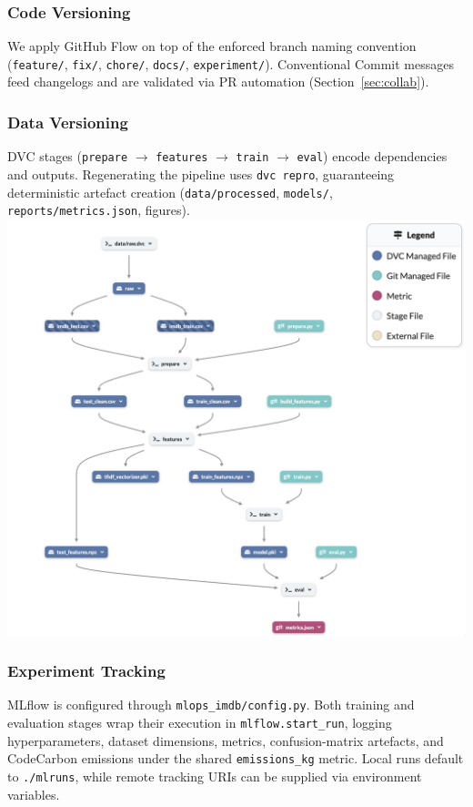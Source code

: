 \documentclass[11pt,a4paper]{article}
\begin{document}
\subsubsection{Code Versioning}
We apply GitHub Flow on top of the enforced branch naming convention (\texttt{feature/}, \texttt{fix/}, \texttt{chore/}, \texttt{docs/}, \texttt{experiment/}). Conventional Commit messages feed changelogs and are validated via PR automation (Section~\ref{sec:collab}).

\subsubsection{Data Versioning}
DVC stages (\texttt{prepare} $\rightarrow$ \texttt{features} $\rightarrow$ \texttt{train} $\rightarrow$ \texttt{eval}) encode dependencies and outputs. Regenerating the pipeline uses \texttt{dvc repro}, guaranteeing deterministic artefact creation (\texttt{data/processed}, \texttt{models/}, \texttt{reports/metrics.json}, figures).
\includegraphics[width=1\textwidth]{dvc_pipeline.png}
\subsubsection{Experiment Tracking}
MLflow is configured through \texttt{mlops\_imdb/config.py}. Both training and evaluation stages wrap their execution in \texttt{mlflow.start\_run}, logging hyperparameters, dataset dimensions, metrics, confusion-matrix artefacts, and CodeCarbon emissions under the shared \texttt{emissions\_kg} metric. Local runs default to \texttt{./mlruns}, while remote tracking URIs can be supplied via environment variables.
\end{document}
